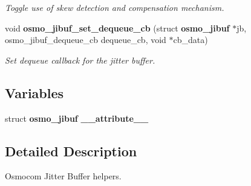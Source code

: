 \begin{DoxyCompactItemize}
\begin{DoxyCompactList}\small\item\em Toggle use of skew detection and compensation mechanism. \end{DoxyCompactList}\item 
void {\bf osmo\+\_\+jibuf\+\_\+set\+\_\+dequeue\+\_\+cb} (struct {\bf osmo\+\_\+jibuf} $\ast$jb, osmo\+\_\+jibuf\+\_\+dequeue\+\_\+cb dequeue\+\_\+cb, void $\ast$cb\+\_\+data)
\begin{DoxyCompactList}\small\item\em Set dequeue callback for the jitter buffer. \end{DoxyCompactList}\end{DoxyCompactItemize}
\subsection*{Variables}
\begin{DoxyCompactItemize}
\item 
struct {\bf osmo\+\_\+jibuf} {\bfseries \+\_\+\+\_\+attribute\+\_\+\+\_\+}
\end{DoxyCompactItemize}


\subsection{Detailed Description}
Osmocom Jitter Buffer helpers. 

